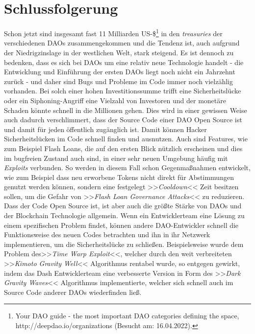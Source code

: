 \documentclass[a4paper,12pt]{report}
\begin{document}
	
	\chapter{Schlussfolgerung}
	
	Schon jetzt sind insgesamt fast 11 Milliarden US-\$\footnote{\hspace{0.5em}\begin{minipage}[t]{13cm}Your DAO guide - the most important DAO categories defining the space, http://deepdao.io/organizations (Besucht am: 16.04.2022).\end{minipage}} in den \textit{treasuries} der verschiedenen DAOs zusammengekommen und die Tendenz ist, auch aufgrund der Niedrigzinslage in der westlichen Welt, stark steigend. Es ist dennoch zu bedenken, dass es sich bei DAOs um eine relativ neue Technologie handelt - die Entwicklung und Einführung der ersten DAOs liegt noch nicht ein Jahrzehnt zurück - und daher sind Bugs und Probleme im Code immer noch vielzählig vorhanden. Bei solch einer hohen Investitionssumme trifft eine Sicherheitslücke oder ein Siphoning-Angriff eine Vielzahl von Investoren und der monetäre Schaden könnte schnell in die Millionen gehen. Dies wird in einer gewissen Weise auch dadurch verschlimmert, dass der Source Code einer DAO Open Source ist und damit für jeden öffentlich zugänglich ist. Damit können Hacker Sicherheitslücken im Code schnell finden und ausnutzen. Auch sind Features, wie zum Beispiel Flash Loans, die auf den ersten Blick nützlich erscheinen und dies im bugfreien Zustand auch sind, in einer sehr neuen Umgebung häufig mit \textit{Exploits} verbunden. So werden in diesem Fall schon Gegenmaßnahmen entwickelt, wie zum Beispiel dass neu erworbene Tokens nicht direkt für Abstimmungen genutzt werden können, sondern eine festgelegt >>\textit{Cooldown}<< Zeit besitzen sollen, um die Gefahr von >>\textit{Flash Loan Governance Attacks}<< zu reduzieren. \\
	Dass der Code Open Source ist, ist aber auch die größte Stärke von DAOs und der Blockchain Technologie allgemein. Wenn ein Entwicklerteam eine Lösung zu einem spezifischen Problem findet, können andere DAO-Entwickler schnell die Funktionsweise des neuen Codes betrachten und ihn in ihr Netzwerk implementieren, um die Sicherheitslücke zu schließen. Beispielsweise wurde dem Problem des>>\textit{Time Warp Exploit}<<, welcher durch den weit verbreiteten >>\textit{Kimoto Gravity Well}<< Algorithmus rentabel wurde, so entgegen gewirkt, indem das Dash Entwicklerteam eine verbesserte Version in Form des >>\textit{Dark Gravity Waves}<< Algorithmus implementierte, welcher sich schnell auch im Source Code anderer DAOs wiederfinden ließ. \\
\end{document}
